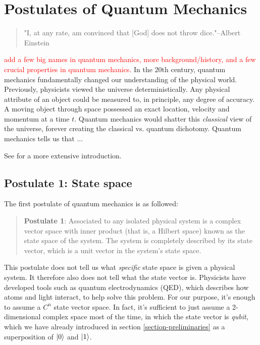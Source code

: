 
\chapter{Postulates of Quantum Mechanics} %

\label{Chapter3-postulates} %

\begin{quote}
"I, at any rate, am convinced that [God] does not throw dice."--Albert Einstein
\end{quote}

\textcolor{red}{add a few big names in quantum mechanics, more background/history, and a few crucial properties in quantum mechanics.}
In the 20th century, quantum mechanics fundamentally changed our understanding of the physical world.  Previously, physicists viewed the universe deterministically.  Any physical attribute of an object could be measured to, in principle, any degree of accuracy.  A moving object through space possessed an exact location, velocity and momentum at a time $t$.  Quantum mechanics would shatter this {\emph{classical}} view of the universe, forever creating the classical vs. quantum dichotomy.  Quantum mechanics tells us that ...


See \cite{Nielsen} for a more extensive introduction.


\section{Postulate 1: State space}

The first postulate of quantum mechanics is as followed: 
\begin{quote}
    \textbf{Postulate 1}: Associated to any isolated physical system is a complex vector space with inner product (that is, a Hilbert space) known as the state space of the system. The system is completely described by its state vector, which is a unit vector in the system's state space.
\end{quote}

This postulate does not tell us what \textit{specific} state space is given a physical system. It therefore also does not tell what the state vector is. Physicists have developed tools such as quantum electrodynamics (QED), which describes how atoms and light interact, to help solve this problem. For our purpose, it's enough to assume a $C^n$ state vector space. In fact, it's sufficient to just assume a 2-dimensional complex space most of the time, in which the state vector is \textit{qubit}, which we have already introduced in section \ref{section-preliminaries} as a superposition of $\ket{0}$ and $\ket{1}$.

